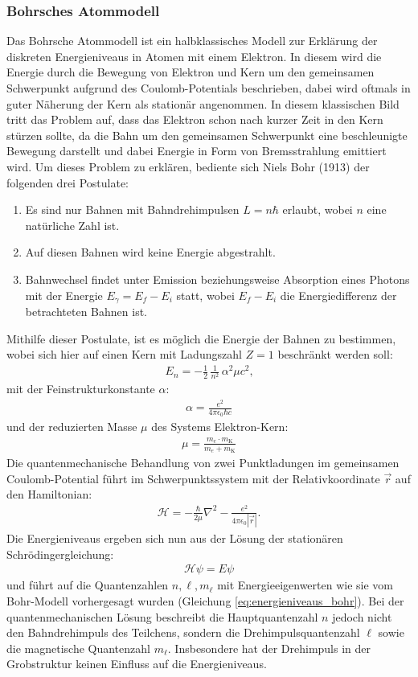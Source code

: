 \documentclass[11pt, a4paper]{article}
\numberwithin{equation}{section}
\begin{document}
\subsubsection{Bohrsches Atommodell}
Das Bohrsche Atommodell ist ein halbklassisches Modell zur Erklärung der diskreten Energieniveaus in Atomen mit einem Elektron.
In diesem wird die Energie durch die Bewegung von Elektron und Kern um den gemeinsamen Schwerpunkt aufgrund des Coulomb-Potentials beschrieben, dabei wird oftmals in guter Näherung der Kern als stationär angenommen.
In diesem klassischen Bild tritt das Problem auf, dass das Elektron schon nach kurzer Zeit in den Kern stürzen sollte, da die Bahn um den gemeinsamen Schwerpunkt eine beschleunigte Bewegung darstellt und dabei Energie in Form von Bremsstrahlung emittiert wird.
Um dieses Problem zu erklären, bediente sich Niels Bohr (1913) der folgenden drei Postulate:
\begin{enumerate}
	\item Es sind nur Bahnen mit Bahndrehimpulsen $L = n \hbar$ erlaubt, wobei $n$ eine natürliche Zahl ist.
	\item Auf diesen Bahnen wird keine Energie abgestrahlt.
	\item Bahnwechsel findet unter Emission beziehungsweise Absorption eines Photons mit der Energie $E_\gamma = E_f - E_i$ statt, wobei $E_f - E_i$ die Energiedifferenz der betrachteten Bahnen ist.
\end{enumerate}
Mithilfe dieser Postulate, ist es möglich die Energie der Bahnen zu bestimmen, wobei sich hier auf einen Kern mit Ladungszahl $Z = \num{1}$ beschränkt werden soll:
\begin{align}
	\label{eq:energieniveaus_bohr}
	E_n = - \frac{1}{2} \, \frac{1}{n^2} \, \alpha^2 \mu c^2 \text{,}
\end{align}
mit der Feinstrukturkonstante $\alpha$:
\begin{align*}
	\alpha = \frac{e^2}{4 \pi \epsilon_0 \hbar c}
\end{align*}
und der reduzierten Masse $\mu$ des Systems Elektron-Kern:
\begin{align*}
	\mu = \frac{m_e \cdot m_\mathrm{K}}{m_e + m_\mathrm{K}}
\end{align*}
Die quantenmechanische Behandlung von zwei Punktladungen im gemeinsamen Coulomb-Potential führt im Schwerpunktssystem mit der Relativkoordinate $\vec{r}$ auf den Hamiltonian:
\begin{align*}
	\mathcal{H} = - \frac{\hbar}{2 \mu} \nabla^2 - \frac{e^2}{4 \pi \epsilon_0 |\vec{r}|} \text{.}
\end{align*}
Die Energieniveaus ergeben sich nun aus der Lösung der stationären Schrödingergleichung:
\begin{align*}
	\mathcal{H} \psi = E \psi
\end{align*}
und führt auf die Quantenzahlen $n, \ell, m_\ell$ mit Energieeigenwerten wie sie vom Bohr-Modell vorhergesagt wurden (Gleichung \ref{eq:energieniveaus_bohr}).
Bei der quantenmechanischen Lösung beschreibt die Hauptquantenzahl $n$ jedoch nicht den Bahndrehimpuls des Teilchens, sondern die Drehimpulsquantenzahl $\ell$ sowie die magnetische Quantenzahl $m_\ell$.
Insbesondere hat der Drehimpuls in der Grobstruktur keinen Einfluss auf die Energieniveaus.
\end{document}
